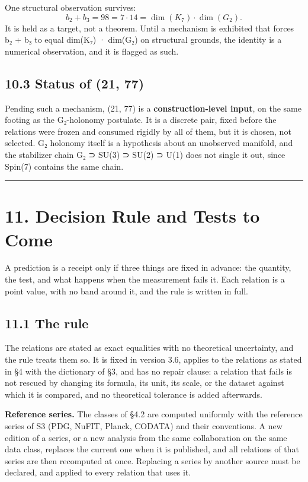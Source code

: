 \documentclass[11pt,a4paper]{article}
\begin{document}
One structural observation survives: \[b_2 + b_3 = 98 = 7 \cdot 14 = \dim(K_7) \cdot \dim(G_2).\] It is held as a target, not a theorem. Until a mechanism is exhibited that forces b₂ + b₃ to equal dim(K₇) · dim(G₂) on structural grounds, the identity is a numerical observation, and it is flagged as such.

\subsection{10.3 Status of (21, 77)}\label{status-of-21-77}

Pending such a mechanism, (21, 77) is a \textbf{construction-level input}, on the same footing as the G₂-holonomy postulate. It is a discrete pair, fixed before the relations were frozen and consumed rigidly by all of them, but it is chosen, not selected. G₂ holonomy itself is a hypothesis about an unobserved manifold, and the stabilizer chain G₂ ⊃ SU(3) ⊃ SU(2) ⊃ U(1) does not single it out, since Spin(7) contains the same chain.

\begin{center}\rule{\linewidth}{0.5pt}\end{center}

\section{11. Decision Rule and Tests to Come}\label{decision-rule-and-tests-to-come}

A prediction is a receipt only if three things are fixed in advance: the quantity, the test, and what happens when the measurement fails it. Each relation is a point value, with no band around it, and the rule is written in full.

\subsection{11.1 The rule}\label{the-rule}

The relations are stated as exact equalities with no theoretical uncertainty, and the rule treats them so. It is fixed in version 3.6, applies to the relations as stated in §4 with the dictionary of §3, and has no repair clause: a relation that fails is not rescued by changing its formula, its unit, its scale, or the dataset against which it is compared, and no theoretical tolerance is added afterwards.

\textbf{Reference series.} The classes of §4.2 are computed uniformly with the reference series of S3 (PDG, NuFIT, Planck, CODATA) and their conventions. A new edition of a series, or a new analysis from the same collaboration on the same data class, replaces the current one when it is published, and all relations of that series are then recomputed at once. Replacing a series by another source must be declared, and applied to every relation that uses it.
\end{document}
